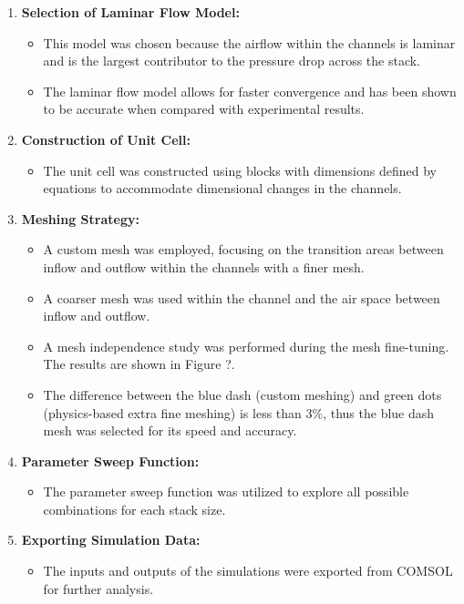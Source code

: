     \begin{enumerate}
        \item \textbf{Selection of Laminar Flow Model:}
        \begin{itemize}
            \item This model was chosen because the airflow within the channels is laminar and is the largest contributor to the pressure drop across the stack.
            \item The laminar flow model allows for faster convergence and has been shown to be accurate when compared with experimental results.
        \end{itemize}
        
        \item \textbf{Construction of Unit Cell:}
        \begin{itemize}
            \item The unit cell was constructed using blocks with dimensions defined by equations to accommodate dimensional changes in the channels.
        \end{itemize}
        
        \item \textbf{Meshing Strategy:}
        \begin{itemize}
            \item A custom mesh was employed, focusing on the transition areas between inflow and outflow within the channels with a finer mesh.
            \item A coarser mesh was used within the channel and the air space between inflow and outflow.
            \item A mesh independence study was performed during the mesh fine-tuning. The results are shown in Figure ?.
            \item The difference between the blue dash (custom meshing) and green dots (physics-based extra fine meshing) is less than 3\%, thus the blue dash mesh was selected for its speed and accuracy.
        \end{itemize}
        
        \item \textbf{Parameter Sweep Function:}
        \begin{itemize}
            \item The parameter sweep function was utilized to explore all possible combinations for each stack size.
        \end{itemize}
        
        \item \textbf{Exporting Simulation Data:}
        \begin{itemize}
            \item The inputs and outputs of the simulations were exported from COMSOL for further analysis.
        \end{itemize}
    \end{enumerate}

